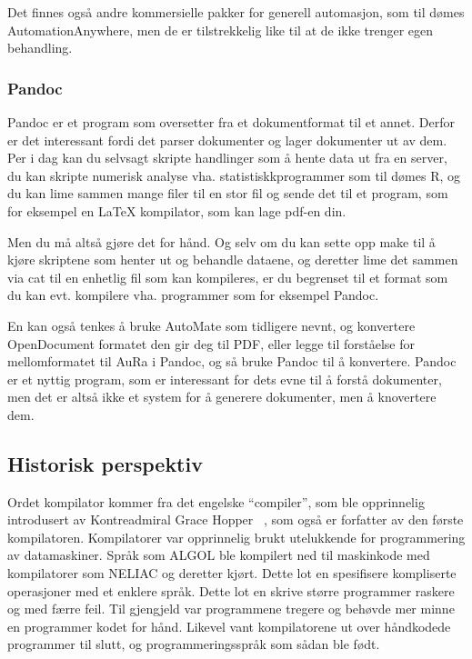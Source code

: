 \documentclass[norsk, 11pt, a4paper]{article}
\begin{document}
Det finnes også andre kommersielle pakker for generell automasjon, som til dømes AutomationAnywhere, men de er tilstrekkelig like til at de ikke trenger egen behandling.



\subsubsection{Pandoc}



Pandoc er et program som oversetter fra et dokumentformat til et annet. Derfor er det interessant fordi det parser dokumenter og lager dokumenter ut av dem.
Per i dag kan du selvsagt skripte handlinger som å hente data ut fra en server, du kan skripte numerisk analyse vha. statistiskkprogrammer som til dømes R, og du kan lime sammen mange filer til en stor fil og sende det til et program, som for eksempel en LaTeX kompilator, som kan lage pdf-en din.



Men du må altså gjøre det for hånd. Og selv om du kan sette opp make til å kjøre skriptene som henter ut og behandle dataene, og deretter lime det sammen via cat til en enhetlig fil som kan kompileres, er du begrenset til et format som du kan evt. kompilere vha. programmer som for eksempel Pandoc.



En kan også tenkes å bruke AutoMate som tidligere nevnt, og konvertere OpenDocument formatet den gir deg til PDF, eller legge til forståelse for mellomformatet til AuRa i Pandoc, og så bruke Pandoc til å konvertere. Pandoc er et nyttig program, som er interessant for dets evne til å forstå dokumenter, men det er altså ikke et system for å generere dokumenter, men å knovertere dem.


\subsection{Historisk perspektiv}

Ordet kompilator kommer fra det engelske ``compiler'', som ble opprinnelig introdusert av Kontreadmiral Grace Hopper ~\cite[s.68]{Wilkes:1968:COM:321439.321440}, som også er forfatter av den første kompilatoren.
Kompilatorer var opprinnelig brukt utelukkende for programmering av datamaskiner. Språk som ALGOL ble kompilert ned til maskinkode med kompilatorer som NELIAC\cite{Huskey:1963:SDB:366663.366664} og deretter kjørt.
Dette lot en spesifisere kompliserte operasjoner med et enklere språk. Dette lot en skrive større programmer raskere og med færre feil. Til gjengjeld var programmene tregere og behøvde mer minne en programmer kodet for hånd.
Likevel vant kompilatorene ut over håndkodede programmer til slutt, og programmeringsspråk som sådan ble født.
\end{document}
